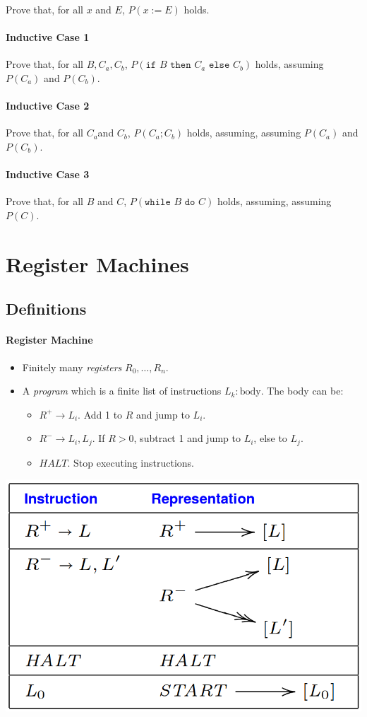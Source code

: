 \documentclass[twocolumn,english]{article}
\begin{document}
Prove that, for all $x$ and $E$, $P\left(x:=E\right)$ holds.

\paragraph{Inductive Case 1}

Prove that, for all $B,C_{a},C_{b}$, $P\left(\texttt{if }B\texttt{ then }C_{a}\texttt{ else }C_{b}\right)$
holds, assuming $P(C_{a})$ and $P(C_{b})$.

\paragraph{Inductive Case 2}

Prove that, for all $C_{a}$and $C_{b}$, $P\left(C_{a};C_{b}\right)$
holds, assuming, assuming $P(C_{a})$ and $P(C_{b})$.

\paragraph{Inductive Case 3}

Prove that, for all $B$ and $C$, $P\left(\texttt{while }B\texttt{ do }C\right)$
holds, assuming, assuming $P(C)$.

\section{Register Machines}

\subsection{Definitions}

\paragraph{Register Machine}
\begin{itemize}
\item Finitely many \emph{registers} $R_{0},\dots,R_{n}$.
\item A \emph{program} which is a finite list of instructions $L_{k}:\text{body}$.
The body can be:
\begin{itemize}
\item $R^{+}\rightarrow L_{i}$. Add 1 to $R$ and jump to $L_{i}$.
\item $R^{-}\rightarrow L_{i},L_{j}$. If $R>0$, subtract 1 and jump to
$L_{i}$, else to $L_{j}$.
\item $HALT$. Stop executing instructions.
\end{itemize}
\end{itemize}
\begin{table}[H]
\centering{}\includegraphics[width=0.45\columnwidth]{img/rm-representation}
\end{table}
\end{document}
